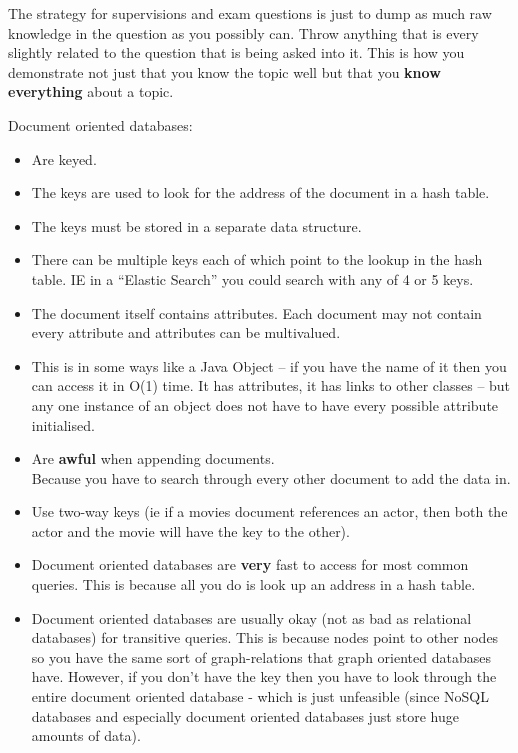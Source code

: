 \documentclass[10pt,\jkfside,a4paper]{article}
\begin{document}
The strategy for supervisions and exam questions is just to dump as much raw knowledge 
in the question as you possibly can. Throw anything that is every slightly related to 
the question that is being asked into it. This is how you demonstrate not just that you 
know the topic well but that you \textbf{know everything} about a topic.

Document oriented databases:
\begin{itemize}
\item Are keyed.
\item The keys are used to look for the address of the document in a hash table.
\item The keys must be stored in a separate data structure.
\item There can be multiple keys each of which point to the lookup in the hash table. 
IE in a ``Elastic Search'' you could search with any of 4 or 5 keys.
\item The document itself contains attributes. Each document may not contain every 
attribute and attributes can be multivalued. 
\item This is in some ways like a Java Object -- if you have the name of it then you 
can access it in O(1) time. It has attributes, it has links to other classes -- but 
any one instance of an object does not have to have every possible attribute initialised.
\item Are \textbf{awful} when appending documents. \\ Because you have to search 
through every other document to add the data in.
\item Use two-way keys (ie if a movies document references an actor, then both the 
actor and the movie will have the key to the other).
\item Document oriented databases are \textbf{very} fast to access for most common 
queries. This is because all you do is look up an address in a hash table.
\item Document oriented databases are usually okay (not as bad as relational databases) 
for transitive queries. This is because nodes point to other nodes so you have the same 
sort of graph-relations that graph oriented databases have. However, if you don't have 
the key then you have to look through the entire document oriented database - which is 
just unfeasible (since NoSQL databases and especially document oriented databases just 
store huge amounts of data).
\end{itemize}
\end{document}

